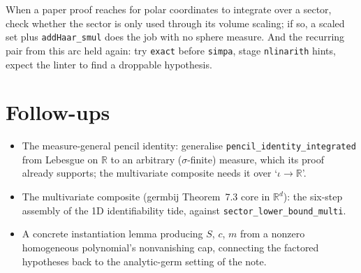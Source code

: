 \documentclass[11pt]{article}
\begin{document}
When a paper proof reaches for polar coordinates to integrate over a sector,
check whether the sector is only used through its volume scaling; if so, a
scaled set plus \texttt{addHaar\_smul} does the job with no sphere measure.
And the recurring pair from this arc held again: try \texttt{exact} before
\texttt{simpa}, stage \texttt{nlinarith} hints, expect the linter to find a
droppable hypothesis.

\section{Follow-ups}

\begin{itemize}
\item The measure-general pencil identity: generalise
\texttt{pencil\_identity\_integrated} from Lebesgue on $\mathbb{R}$ to an
arbitrary ($\sigma$-finite) measure, which its proof already supports; the
multivariate composite needs it over `$\iota \to \mathbb{R}$'.
\item The multivariate composite (germbij Theorem~7.3 core in $\mathbb{R}^d$):
the six-step assembly of the 1D identifiability tide, against
\texttt{sector\_lower\_bound\_multi}.
\item A concrete instantiation lemma producing $S$, $c$, $m$ from a nonzero
homogeneous polynomial's nonvanishing cap, connecting the factored
hypotheses back to the analytic-germ setting of the note.
\end{itemize}
\end{document}
